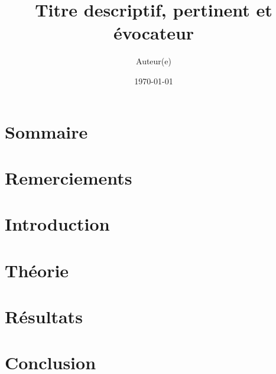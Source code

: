 \documentclass[titlepage,\numsides,openright,letterpaper,12pt]{book}
\begin{document}
\title{Titre descriptif, pertinent et évocateur} %
\author{ Auteur(e) }  %
\date{\today}       %






\frontmatter %




\thispagestyle{empty}

\clearpage  %
\chapter*{Sommaire}


\chapter*{Remerciements}


{
    \setlength{\parskip}{0ex}
    \tableofcontents
    \listoffigures
}


\mainmatter %
\onehalfspacing


\chapter{Introduction}


\chapter{Théorie}


\chapter{Résultats}


\chapter{Conclusion}

\end{document}
